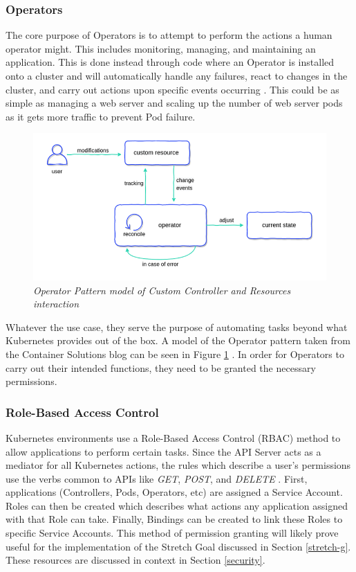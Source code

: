 \documentclass{article}
\begin{document}
\subsubsection{Operators}

The core purpose of Operators is to attempt to perform the actions a human operator might. This includes monitoring, managing, and maintaining an application. This is done instead through code where an Operator is installed onto a cluster and will automatically handle any failures, react to changes in the cluster, and carry out actions upon specific events occurring \cite{operator-pattern}. This could be as simple as managing a web server and scaling up the number of web server pods as it gets more traffic to prevent Pod failure.
\begin{figure}[H]
    \centering
    \includegraphics[width=160mm]{tech/operator-pattern.png}
    \caption{\emph{Operator Pattern model of Custom Controller and Resources interaction}}
    \label{op-pat}
\end{figure}

Whatever the use case, they serve the purpose of automating tasks beyond what Kubernetes provides out of the box. A model of the Operator pattern taken from the Container Solutions blog can be seen in Figure \ref{op-pat} \cite{op-pat-blog}. In order for Operators to carry out their intended functions, they need to be granted the necessary permissions.



\subsubsection{Role-Based Access Control}

Kubernetes environments use a Role-Based Access Control (RBAC) method to allow applications to perform certain tasks. Since the API Server acts as a mediator for all Kubernetes actions, the rules which describe a user's permissions use the verbs common to APIs like \emph{GET}, \emph{POST}, and \emph{DELETE} \cite{rbac}. First, applications (Controllers, Pods, Operators, etc) are assigned a Service Account. Roles can then be created which describes what actions any application assigned with that Role can take. Finally, Bindings can be created to link these Roles to specific Service Accounts. This method of permission granting will likely prove useful for the implementation of the Stretch Goal discussed in Section \ref{stretch-g}. These resources are discussed in context in Section \ref{security}.
\end{document}
